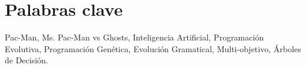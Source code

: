 \chapter{Palabras clave}
Pac-Man, Ms. Pac-Man vs Ghosts, Inteligencia Artificial, Programación Evolutiva, Programación Genética, Evolución Gramatical, Multi-objetivo, Árboles de Decisión.
